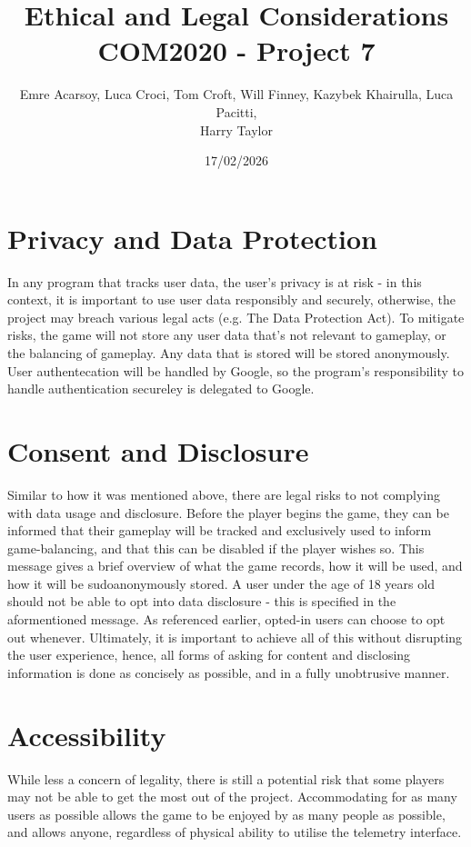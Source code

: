 \documentclass[11pt]{article}
\title{Ethical and Legal Considerations\\[0.3em]
\large COM2020 - Project 7}
\author{Emre Acarsoy, Luca Croci, Tom Croft, Will Finney, Kazybek Khairulla, Luca Pacitti, \\ Harry Taylor}
\date{17/02/2026}
\begin{document}
\maketitle
\tableofcontents
\newpage

\section{Privacy and Data Protection}

In any program that tracks user data, the user’s privacy is at risk - in this context, it is important to use user data responsibly and securely, otherwise, the project may breach various legal acts (e.g. The Data Protection Act). To mitigate risks, the game will not store any user data that’s not relevant to gameplay, or the balancing of gameplay. Any data that is stored will be stored anonymously. User authentecation will be handled by Google, so the program's responsibility to handle authentication secureley is delegated to Google.

\section{Consent and Disclosure}

Similar to how it was mentioned above, there are legal risks to not complying with data usage and disclosure. Before the player begins the game, they can be informed that their gameplay will be tracked and exclusively used to inform game-balancing, and that this can be disabled if the player wishes so. This message gives a brief overview of what the game records, how it will be used, and how it will be sudoanonymously stored. A user under the age of 18 years old should not be able to opt into data disclosure - this is specified in the aformentioned message. As referenced earlier, opted-in users can choose to opt out whenever. Ultimately, it is important to achieve all of this without disrupting the user experience, hence, all forms of asking for content and disclosing information is done as concisely as possible, and in a fully unobtrusive manner.

\newpage
\section{Accessibility}

While less a concern of legality, there is still a potential risk that some players may not be able to get the most out of the project. Accommodating for as many users as possible allows the game to be enjoyed by as many people as possible, and allows anyone, regardless of physical ability to utilise the telemetry interface. 
\end{document}
